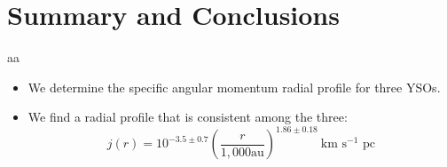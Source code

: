 \section{Summary and Conclusions}
aa
\begin{itemize}
\item We determine the specific angular momentum radial profile for three YSOs. 
\item We find a radial profile that is consistent among the three:
\[ j(r) = 10^{-3.5\pm0.7}\left( \frac{r}{1,000 \textrm{au}}\right)^{1.86\pm 0.18}~\textrm{km s$^{-1}$ pc}\]
\end{itemize}
  
  
  